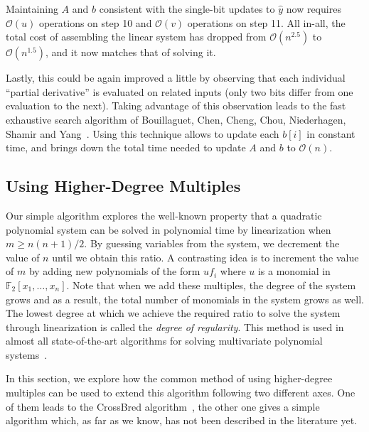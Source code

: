 \documentclass[a4paper,UKenglish,cleveref, autoref]{lipics-v2019}
\newcommand{\bigO}[1]{\ensuremath{\mathcal{O}\left( #1 \right)} }
\begin{document}
Maintaining $A$ and $b$ consistent with the single-bit updates to $\hat y$ now
requires $\bigO{u}$ operations on step 10 and $\bigO{v}$ operations on step
11. All in-all, the total cost of assembling the linear system has dropped from
$\bigO{n^{2.5}}$ to $\bigO{n^{1.5}}$, and it now matches that of solving it.

Lastly, this could be again improved a little by observing that each individual
``partial derivative'' is evaluated on related inputs (only two bits differ from
one evaluation to the next). Taking advantage of this observation leads to the
fast exhaustive search algorithm of Bouillaguet, Chen, Cheng, Chou, Niederhagen,
Shamir and Yang~\cite{BouillaguetCCCNSY10}. Using this technique allows to
update each $b[i]$ in constant time, and brings down the total time needed to
update $A$ and $b$ to $\bigO{n}$.

\subsection{Using Higher-Degree Multiples}

Our simple algorithm explores the well-known property that a quadratic polynomial system can be solved in polynomial time by linearization when $m \geq n(n+1)/2$.
By guessing variables from the system, we decrement the value of $n$ until we obtain this ratio. A contrasting idea is to increment the value of $m$ by adding new polynomials of the form $uf_i$ where $u$ is a monomial in $\mathbb{F}_2[x_1, \dots, x_n]$.
Note that when we add these multiples, the degree of the system grows and as a result, the total number of monomials in the system grows as well. The lowest degree at which we achieve the required ratio to solve the system through linearization is called the \textit{degree of regularity}. This method is used in almost all state-of-the-art algorithms for solving multivariate polynomial systems~\cite{F4,F5,CourtoisKPS00,BardetFSS13,JouxV17}. 

In this section, we explore how the common method of using higher-degree multiples can be used to extend this algorithm following two different axes.
%
One of them leads to the \textsf{CrossBred} algorithm~\cite{JouxV17}, the other
one gives a simple algorithm which, as far as we know, has not been described
in the literature yet.
\end{document}
